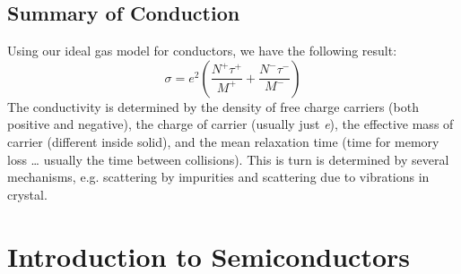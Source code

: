 \subsection{Summary of Conduction}
Using our ideal gas model for conductors, we have the following result:
    \begin{equation}
        \sigma = {e^2}\left( {\frac{{{N^ + }{\tau ^ + }}}{{{M^ + }}} + \frac{{{N^ - }{\tau ^ - }}}{{{M^ - }}}} \right)
    \end{equation}
The conductivity is determined by the density of free charge carriers (both positive and negative), the charge of carrier (usually just \textit{e}), the effective mass of carrier (different inside solid), and the mean relaxation time (time for memory loss … usually the time between collisions).   This is turn is determined by several mechanisms, e.g. scattering by impurities and scattering due to vibrations in crystal.
\section{Introduction to Semiconductors}
